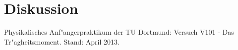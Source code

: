 \section{Diskussion}
\label{diskussion}

	

\begin{thebibliography}{9}
	 Physikalisches Anf"angerpraktikum der TU Dortmund: Versuch V101 - Das Tr"agheitsmoment. Stand: April 2013.
\end{thebibliography}
